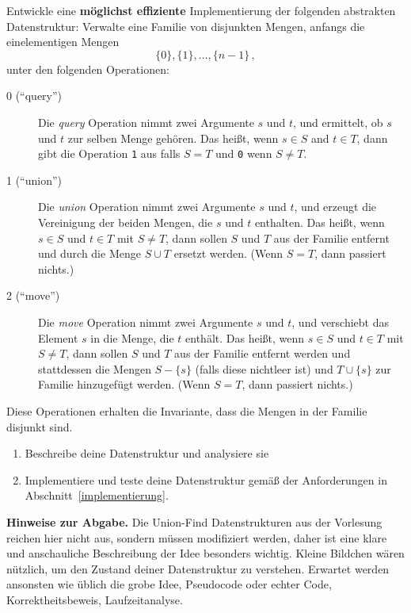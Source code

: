 \documentclass{uebung_cs}
\begin{document}
\begin{aufgabe}
  Entwickle eine \textbf{möglichst effiziente} Implementierung der folgenden abstrakten Datenstruktur:
  Verwalte eine Familie von disjunkten Mengen, anfangs die einelementigen Mengen
  \[ \{0\},\{1\}, \ldots,\{n-1\}\,,\]
  unter den folgenden Operationen:
  \begin{description}
   \item[0 (\enquote{query})]
      Die \emph{query} Operation nimmt zwei Argumente $s$ und $t$, und ermittelt, ob $s$ und $t$ zur selben Menge gehören.
      Das heißt, wenn $s\in S$ and $t\in T$, dann gibt die Operation \texttt{1} aus falls $S=T$ und \texttt{0} wenn $S\neq T$.
    \item[1 (\enquote{union})]
    Die \emph{union} Operation nimmt zwei Argumente $s$ und $t$, und erzeugt die Vereinigung der beiden Mengen, die $s$ und $t$ enthalten.
    Das heißt, wenn $s\in S$ und $t\in T$ mit $S\neq T$, dann sollen $S$ und $T$ aus der Familie entfernt und durch die Menge $S\cup T$ ersetzt werden.
      (Wenn $S=T$, dann passiert nichts.)
    \item[2 (\enquote{move})]
      Die \emph{move} Operation nimmt zwei Argumente $s$ und $t$, und verschiebt das Element $s$ in die Menge, die $t$ enthält.
      Das heißt, wenn $s\in S$ und $t\in T$ mit $S\neq T$, dann sollen $S$ und $T$ aus der Familie entfernt werden und stattdessen die Mengen $S-\{s\}$ (falls diese nichtleer ist)  und $T\cup\{s\}$ zur Familie hinzugefügt werden.
      (Wenn $S= T$, dann passiert nichts.)
  \end{description}
  Diese Operationen erhalten die Invariante, dass die Mengen in der Familie disjunkt sind.
  
  \begin{enumerate}
    \item\label{describe} Beschreibe deine Datenstruktur und analysiere sie
    \item\label{implement} Implementiere und teste deine Datenstruktur gemäß der Anforderungen in Abschnitt~\ref{implementierung}.
  \end{enumerate}

  \textbf{Hinweise zur Abgabe.}
  Die Union-Find Datenstrukturen aus der Vorlesung reichen hier nicht aus, sondern müssen modifiziert werden, daher ist eine klare und anschauliche Beschreibung der Idee besonders wichtig. Kleine Bildchen wären nützlich, um den Zustand deiner Datenstruktur zu verstehen.
  Erwartet werden ansonsten wie üblich die grobe Idee, Pseudocode oder echter Code, Korrektheitsbeweis, Laufzeitanalyse.


\end{aufgabe}
\end{document}
